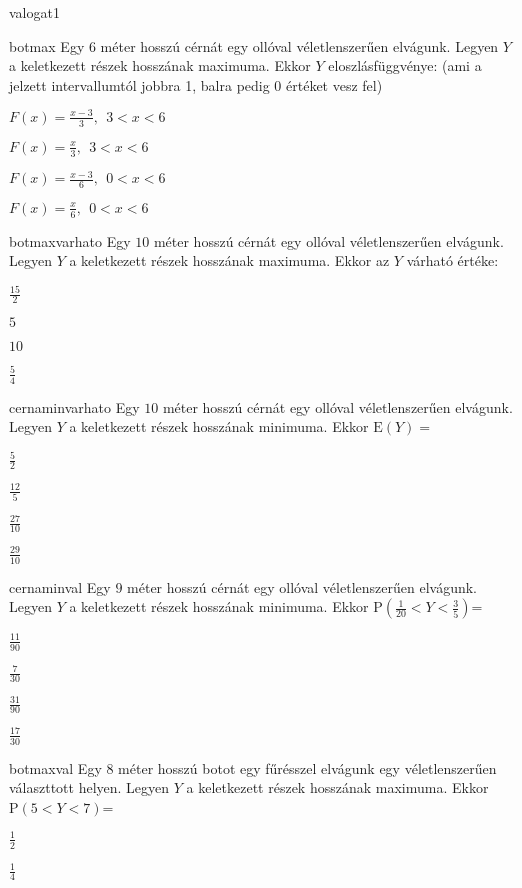 \documentclass[12pt]{article}
\begin{document}
\begin{quiz}{valogat1}
\begin{multi}{botmax}
Egy $ 6 $ méter hosszú cérnát egy ollóval véletlenszerűen elvágunk.
Legyen $ Y $ a keletkezett részek hosszának maximuma.
Ekkor $ Y $ eloszlásfüggvénye: (ami a jelzett intervallumtól jobbra 1,
balra pedig 0 értéket vesz fel)
\item* $ F(x)=\frac{x-3}{3},\:\: 3<x<6 $
\item $ F(x)=\frac{x}{3},\:\: 3<x<6 $
\item $ F(x)=\frac{x-3}{6},\:\: 0<x<6 $
\item $ F(x)=\frac{x}{6},\:\: 0<x<6 $
\end{multi}
\begin{multi}{botmaxvarhato}
Egy $ 10 $ méter hosszú cérnát egy ollóval véletlenszerűen elvágunk.
Legyen $ Y $ a keletkezett részek hosszának maximuma.
Ekkor az $ Y $ várható értéke:
\item* $ \frac{15}{2} $
\item $ 5 $
\item $ 10 $
\item $ \frac{5}{4} $
\end{multi}
\begin{multi}{cernaminvarhato}
Egy $ 10 $ méter hosszú cérnát egy ollóval véletlenszerűen elvágunk.
Legyen $ Y $ a keletkezett részek hosszának minimuma.
Ekkor $\mathrm{E}(Y)=$
\item* $ \frac{5}{2} $
\item $ \frac{12}{5} $
\item $ \frac{27}{10} $
\item $ \frac{29}{10} $
\end{multi}
\begin{multi}{cernaminval}
Egy $ 9 $ méter hosszú cérnát egy ollóval véletlenszerűen elvágunk.
Legyen $ Y $ a keletkezett részek hosszának minimuma.
Ekkor $ \mathrm{P}(\frac{1}{20}<Y<\frac{3}{5}) $=
\item* $ \frac{11}{90} $
\item $ \frac{7}{30} $
\item $ \frac{31}{90} $
\item $ \frac{17}{30} $
\end{multi}
\begin{multi}{botmaxval}
Egy $ 8 $ méter hosszú botot egy fűrésszel elvágunk egy véletlenszerűen választtott
helyen.
Legyen $ Y $ a keletkezett részek hosszának maximuma.
Ekkor $ \mathrm{P}(5<Y<7) $=
\item* $ \frac{1}{2} $
\item $ \frac{1}{4} $

\end{multi}
\end{quiz}
\end{document}

